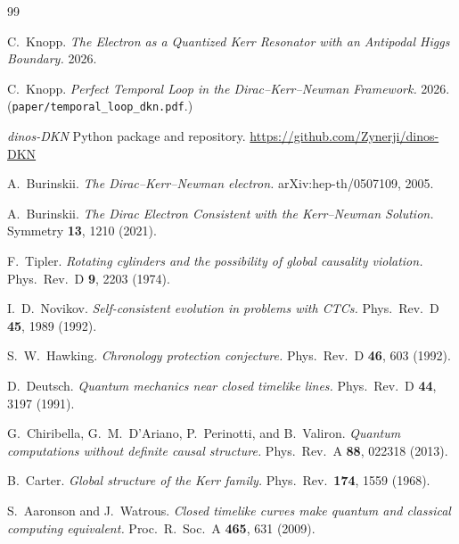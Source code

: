 \documentclass[11pt,a4paper]{article}
\theoremstyle{definition}
\begin{document}
\begin{thebibliography}{99}

 C.\ Knopp.
  \emph{The Electron as a Quantized Kerr Resonator with an Antipodal
  Higgs Boundary.} 2026.

 C.\ Knopp.
  \emph{Perfect Temporal Loop in the Dirac--Kerr--Newman Framework.}
  2026. (\texttt{paper/temporal\_loop\_dkn.pdf}.)

 \emph{dinos-DKN} Python package and repository.
  \url{https://github.com/Zynerji/dinos-DKN}

 A.\ Burinskii. \emph{The Dirac--Kerr--Newman
  electron.} arXiv:hep-th/0507109, 2005.

 A.\ Burinskii.
  \emph{The Dirac Electron Consistent with the Kerr--Newman Solution.}
  Symmetry \textbf{13}, 1210 (2021).

 F.\ Tipler.
  \emph{Rotating cylinders and the possibility of global causality
  violation.} Phys.\ Rev.\ D \textbf{9}, 2203 (1974).

 I.\ D.\ Novikov.
  \emph{Self-consistent evolution in problems with CTCs.}
  Phys.\ Rev.\ D \textbf{45}, 1989 (1992).

 S.\ W.\ Hawking.
  \emph{Chronology protection conjecture.} Phys.\ Rev.\ D
  \textbf{46}, 603 (1992).

 D.\ Deutsch.
  \emph{Quantum mechanics near closed timelike lines.}
  Phys.\ Rev.\ D \textbf{44}, 3197 (1991).

 G.\ Chiribella, G.\ M.\ D'Ariano, P.\ Perinotti,
  and B.\ Valiron.
  \emph{Quantum computations without definite causal structure.}
  Phys.\ Rev.\ A \textbf{88}, 022318 (2013).

 B.\ Carter.
  \emph{Global structure of the Kerr family.} Phys.\ Rev.\ \textbf{174},
  1559 (1968).

 S.\ Aaronson and J.\ Watrous.
  \emph{Closed timelike curves make quantum and classical
  computing equivalent.} Proc.\ R.\ Soc.\ A \textbf{465}, 631 (2009).

\end{thebibliography}
\end{document}
